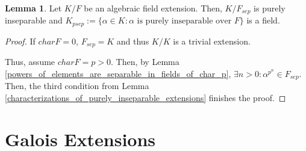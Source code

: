 \documentclass{article}
\theoremstyle{definition}
\newtheorem{lemma}[theorem]{Lemma}
\begin{document}
\begin{lemma}
    Let $K/F$ be an algebraic field extension. Then, $K/F_{sep}$ is purely inseparable
    and $K_{psep} := \{ \alpha \in K: \alpha \text{ is purely inseparable over $F$}\}$
    is a field.
\end{lemma}
\begin{proof}
    If $charF = 0$, $F_{sep} = K$ and thus $K/K$ is a trivial extension.

    Thus, assume $charF = p > 0$. Then, by Lemma \ref{powers_of_elements_are_separable_in_fields_of_char_p},
    $\exists n > 0: \alpha^{p^{n}} \in F_{sep}$. Then, the third condition from Lemma \ref{characterizations_of_purely_inseparable_extensions}
    finishes the proof.
\end{proof}

\newpage

\section{Galois Extensions}
\end{document}

